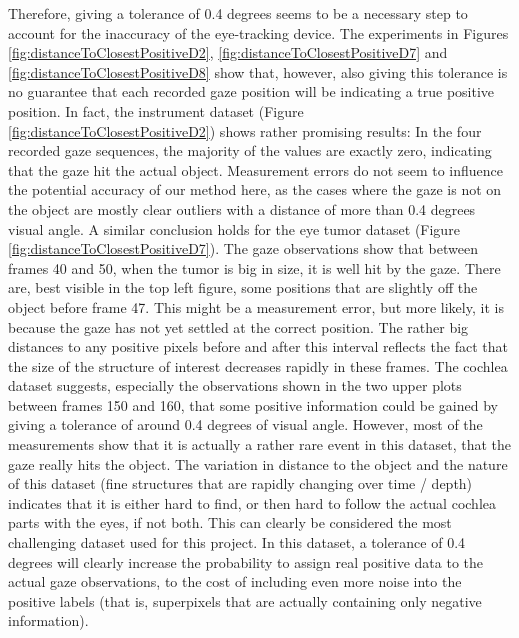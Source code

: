 Therefore, giving a tolerance of 0.4 degrees seems to be a necessary step to account for the inaccuracy of the eye-tracking device. 
The experiments in Figures \ref{fig:distanceToClosestPositiveD2}, \ref{fig:distanceToClosestPositiveD7} and \ref{fig:distanceToClosestPositiveD8} show that, however, also giving this tolerance is no guarantee that each recorded gaze position will be indicating a true positive position. 
In fact, the instrument dataset (Figure \ref{fig:distanceToClosestPositiveD2}) shows rather promising results: 
In the four recorded gaze sequences, the majority of the values are exactly zero, indicating that the gaze hit the actual object. 
Measurement errors do not seem to influence the potential accuracy of our method here, as the cases where the gaze is not on the object are mostly clear outliers with a distance of more than 0.4 degrees visual angle. 
A similar conclusion holds for the eye tumor dataset (Figure \ref{fig:distanceToClosestPositiveD7}). 
The gaze observations show that between frames 40 and 50, when the tumor is big in size, it is well hit by the gaze. 
There are, best visible in the top left figure, some positions that are slightly off the object before frame 47. 
This might be a measurement error, but more likely, it is because the gaze has not yet settled at the correct position. 
The rather big distances to any positive pixels before and after this interval reflects the fact that the size of the structure of interest decreases rapidly in these frames. 
The cochlea dataset suggests, especially the observations shown in the two upper plots between frames 150 and 160, that some positive information could be gained by giving a tolerance of around 0.4 degrees of visual angle. However, most of the measurements show that it is actually a rather rare event in this dataset, that the gaze really hits the object. 
The variation in distance to the object and the nature of this dataset (fine structures that are rapidly changing over time / depth) indicates that it is either hard to find, or then hard to follow the actual cochlea parts with the eyes, if not both. 
This can clearly be considered the most challenging dataset used for this project.
In this dataset, a tolerance of 0.4 degrees will clearly increase the probability to assign real positive data to the actual gaze observations, to the cost of including even more noise into the positive labels (that is, superpixels that are actually containing only negative information).

